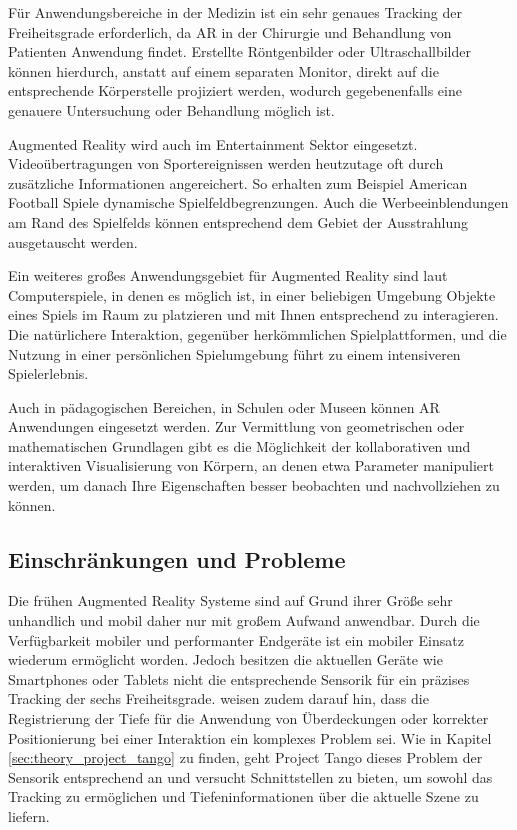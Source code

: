 Für Anwendungsbereiche in der Medizin ist ein sehr genaues Tracking der Freiheitsgrade erforderlich, da AR in der Chirurgie und Behandlung von Patienten Anwendung findet. Erstellte Röntgenbilder oder Ultraschallbilder können hierdurch, anstatt auf einem separaten Monitor, direkt auf die entsprechende Körperstelle projiziert werden, wodurch gegebenenfalls eine genauere Untersuchung oder Behandlung möglich ist. \citep{van2010survey} 

Augmented Reality wird auch im Entertainment Sektor eingesetzt. Videoübertragungen von Sportereignissen werden heutzutage oft durch zusätzliche Informationen angereichert. So erhalten zum Beispiel American Football Spiele dynamische Spielfeldbegrenzungen. Auch die Werbeeinblendungen am Rand des Spielfelds können entsprechend dem Gebiet der Ausstrahlung ausgetauscht werden. \citep{azuma2001recent} 

Ein weiteres großes Anwendungsgebiet für Augmented Reality sind laut \citet{azuma2001recent} Computerspiele, in denen es möglich ist, in einer beliebigen Umgebung Objekte eines Spiels im Raum zu platzieren und mit Ihnen entsprechend zu interagieren. Die natürlichere Interaktion, gegenüber herkömmlichen Spielplattformen, und die Nutzung in einer persönlichen Spielumgebung führt zu einem intensiveren Spielerlebnis. 

Auch in pädagogischen Bereichen, in Schulen oder Museen können AR Anwendungen eingesetzt werden. Zur Vermittlung von geometrischen oder mathematischen Grundlagen gibt es die Möglichkeit der kollaborativen und interaktiven Visualisierung von Körpern, an denen etwa Parameter manipuliert werden, um danach Ihre Eigenschaften besser beobachten und nachvollziehen zu können. \citep{van2010survey} 

\subsection{Einschränkungen und Probleme}

Die frühen Augmented Reality Systeme sind auf Grund ihrer Größe sehr unhandlich und mobil daher nur mit großem Aufwand anwendbar. Durch die Verfügbarkeit mobiler und performanter Endgeräte ist ein mobiler Einsatz wiederum ermöglicht worden. Jedoch besitzen die aktuellen Geräte wie Smartphones oder Tablets nicht die entsprechende Sensorik für ein präzises Tracking der sechs Freiheitsgrade. \citet{van2010survey} weisen zudem darauf hin, dass die Registrierung der Tiefe für die Anwendung von Überdeckungen oder korrekter Positionierung bei einer Interaktion ein komplexes Problem sei. Wie in Kapitel \ref{sec:theory_project_tango} zu finden, geht Project Tango dieses Problem der Sensorik entsprechend an und versucht Schnittstellen zu bieten, um sowohl das Tracking zu ermöglichen und Tiefeninformationen über die aktuelle Szene zu liefern. 

